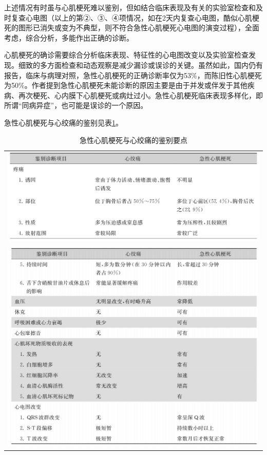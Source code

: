 上述情况有时虽与心肌梗死难以鉴别，但如结合临床表现及有关的实验室检查和及时复查心电图（以上的第②、③、④项情况，如在2天内复查心电图，酷似心肌梗死的图形已消失或变为不典型，则不符合急性心肌梗死心电图的演变过程），全面考虑，综合分析，多能作出正确的诊断。

心肌梗死的确诊需要综合分析临床表现、特征性的心电图改变以及实验室检查发现。细致的多方面检查和动态观察是减少漏诊或误诊的关键。虽然如此，国内仍有报告，临床与病理对照，急性心肌梗死的正确诊断率仅为53\%，而陈旧性心肌梗死为50\%。作者提到急性心肌梗死未能诊断的原因主要是由于并发或伴发于其他疾病、再次梗死、心内膜下心肌梗死或病灶过小。急性心肌梗死临床表现多样化，即所谓“同病异症”，也可能是误诊的一个原因。

急性心肌梗死与心绞痛的鉴别见表\ref{tab10-3}。

\begin{longtable}{c}
 \caption{急性心肌梗死与心绞痛的鉴别要点}
 \label{tab10-3}
 \endfirsthead
 \caption[]{急性心肌梗死与心绞痛的鉴别要点}
 \endhead
 \includegraphics[width=\textwidth,height=\textheight,keepaspectratio]{./images/Image00076.jpg}\\
 \includegraphics[width=\textwidth,height=\textheight,keepaspectratio]{./images/Image00077.jpg}
 \end{longtable}

